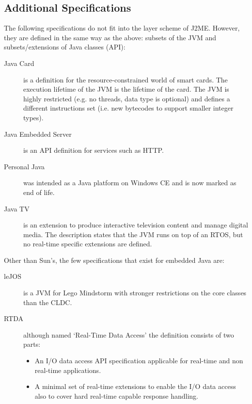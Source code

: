 \subsection{Additional Specifications}

The following specifications do not fit into the layer scheme of
J2ME. However, they are defined in the same way as the above:
subsets of the JVM and subsets/extensions of Java classes (API):
%
\begin{description}
    \item[Java Card] is a definition for the resource-constrained world of smart
cards. The execution lifetime of the JVM is the lifetime of the
card. The JVM is highly restricted (e.g. no threads, data type
 is optional) and defines a different instructions set
(i.e. new bytecodes to support smaller integer types).

    \item[Java Embedded Server] is an API definition for services such as HTTP.

    \item[Personal Java] was intended as a Java platform on Windows CE
and is now marked as end of life.

    \item[Java TV] is an extension to produce interactive
television content and manage digital media. The description states
that the JVM runs on top of an RTOS, but no real-time specific
extensions are defined.

\end{description}
%
Other than Sun's, the few specifications that exist for embedded
Java are:
%
\begin{description}
    \item[leJOS] \cite{lejos} is a JVM for Lego Mindstorm with stronger restrictions
on the core classes than the CLDC.

    \item[RTDA] \cite{rtda01} although named `Real-Time Data Access' the
definition consists of two parts:

    \begin{itemize}
        \item An I/O data access API specification applicable
        for real-time and non real-time applications.
        \item A minimal set of real-time extensions to enable
        the I/O data access also to cover hard real-time capable
        response handling.
    \end{itemize}
\end{description}

